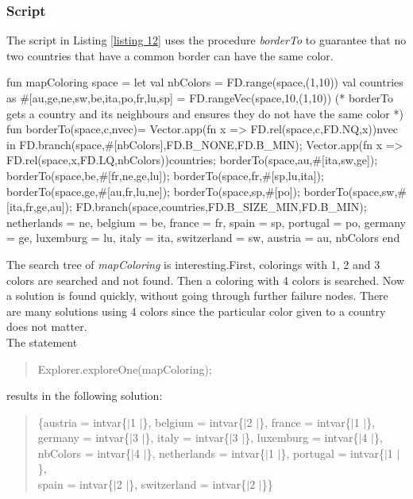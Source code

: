\documentclass[a4paper]{scrartcl}
\begin{document}
\subsubsection{Script}
The script in Listing \ref{listing 12} uses the procedure {\it borderTo}
to guarantee that no two countries that have a common border can
have the same color.\\
\begin{myverbatim}
fun mapColoring space =
 let
    val nbColors = FD.range(space,(1,10))
    val countries as #[au,ge,ne,sw,be,ita,po,fr,lu,sp] =
            FD.rangeVec(space,10,(1,10))
    (* borderTo gets a country and its neighbours and
          ensures they do not have the same color *) 
    fun borderTo(space,c,nvec)=
                Vector.app(fn x => FD.rel(space,c,FD.NQ,x))nvec
 in
    FD.branch(space,#[nbColors],FD.B_NONE,FD.B_MIN);
    Vector.app(fn x => FD.rel(space,x,FD.LQ,nbColors))countries;
    borderTo(space,au,#[ita,sw,ge]);
    borderTo(space,be,#[fr,ne,ge,lu]);
    borderTo(space,fr,#[sp,lu,ita]);
    borderTo(space,ge,#[au,fr,lu,ne]);
    borderTo(space,sp,#[po]);
    borderTo(space,sw,#[ita,fr,ge,au]);
    FD.branch(space,countries,FD.B_SIZE_MIN,FD.B_MIN);
    { netherlands = ne, belgium = be, france = fr, spain = sp,
      portugal = po, germany = ge, luxemburg = lu, italy = ita,
      switzerland = sw, austria = au, nbColors}
 end
\end{myverbatim}

\par
The search tree of {\it mapColoring} is interesting.First, 
colorings with 1, 2 and 3 colors are searched and not found. 
Then a coloring with 4 colors is searched. Now a solution is 
found quickly, without going through further failure nodes. 
There are many solutions using 4 colors since the particular 
color given to a country does not matter.\\
The statement
\begin{quote}
Explorer.exploreOne(mapColoring);
\end{quote}
results in the following solution:
\begin{quote}
\{austria = intvar\{$|$1 $|$\}, 
 belgium = intvar\{$|$2 $|$\}, 
 france = intvar\{$|$1 $|$\}, \\
 germany = intvar\{$|$3 $|$\}, 
 italy = intvar\{$|$3 $|$\}, 
 luxemburg = intvar\{$|$4 $|$\}, \\
 nbColors = intvar\{$|$4 $|$\}, 
 netherlands = intvar\{$|$1 $|$\}, 
 portugal = intvar\{$|$1 $|$\}, \\
 spain = intvar\{$|$2 $|$\}, 
 switzerland = intvar\{$|$2 $|$\}\}
\end{quote}
\end{document}
